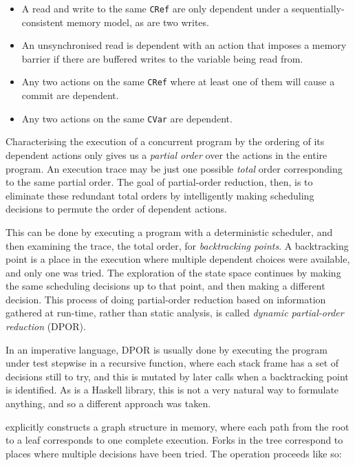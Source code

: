 \begin{itemize}
\item A read and write to the same \verb|CRef| are only dependent
  under a sequentially-consistent memory model, as are two writes.

\item An unsynchronised read is dependent with an action that imposes
  a memory barrier if there are buffered writes to the variable being
  read from.

\item Any two actions on the same \verb|CRef| where at least one of
  them will cause a commit are dependent.

\item Any two actions on the same \verb|CVar| are dependent.
\end{itemize}

Characterising the execution of a concurrent program by the ordering
of its dependent actions only gives us a \emph{partial order} over the
actions in the entire program. An execution trace may be just one
possible \emph{total} order corresponding to the same partial
order. The goal of partial-order reduction, then, is to eliminate
these redundant total orders by intelligently making scheduling
decisions to permute the order of dependent actions.

This can be done by executing a program with a deterministic
scheduler, and then examining the trace, the total order, for
\emph{backtracking points}. A backtracking point is a place in the
execution where multiple dependent choices were available, and only
one was tried. The exploration of the state space continues by making
the same scheduling decisions up to that point, and then making a
different decision. This process of doing partial-order reduction
based on information gathered at run-time, rather than static
analysis, is called \emph{dynamic partial-order reduction} (DPOR).


In an imperative language, DPOR is usually done by executing the
program under test stepwise in a recursive function, where each stack
frame has a set of decisions still to try, and this is mutated by
later calls when a backtracking point is identified. As \dejafu{} is a
Haskell library, this is not a very natural way to formulate anything,
and so a different approach was taken.

\dejafu{} explicitly constructs a graph structure in memory, where
each path from the root to a leaf corresponds to one complete
execution. Forks in the tree correspond to places where multiple
decisions have been tried. The operation proceeds like so:

